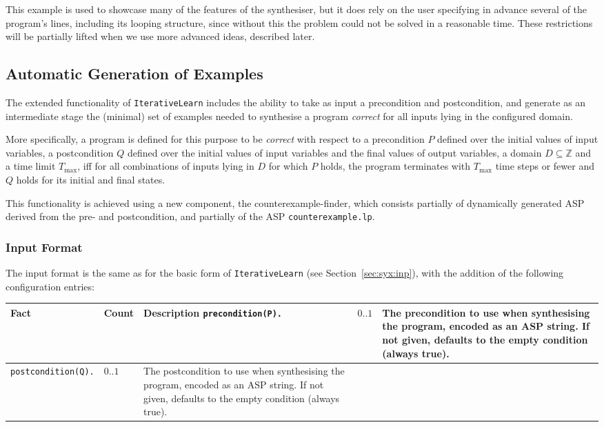 \documentclass[a4paper,twoside,notitlepage,12pt]{article}
\begin{document}
This example is used to showcase many of the features of the synthesiser, but 
it does rely on the user specifying in advance several of the program's lines, 
including its looping structure, since without this the problem could not be solved in 
a reasonable time. These restrictions will be partially lifted when we use more 
advanced ideas, described later.

\subsection{Automatic Generation of Examples} \label{sec:gnx}

The extended functionality of \verb|IterativeLearn| includes the ability to take as input a 
precondition and postcondition, and generate as an intermediate stage the (minimal) set of examples 
needed to synthesise a program \emph{correct} for all inputs lying in the configured domain.

More specifically, a program is defined for this purpose to be \emph{correct} with respect to a 
precondition $P$ defined over the initial values of input variables, a postcondition $Q$ defined 
over the initial values of input variables and the final values of output variables, a domain 
$D\subseteq\mathbb{Z}$ and a time limit $T_\mathrm{max}$, iff for all combinations of inputs lying 
in $D$ for which $P$ holds, the program terminates with $T_\mathrm{max}$ time steps or fewer and 
$Q$ holds for its initial and final states.

This functionality is achieved using a new component, the counterexample-finder, which consists 
partially of dynamically generated ASP derived from the pre- and postcondition, and partially of 
the ASP \verb|counterexample.lp|.

\subsubsection{Input Format} \label{sec:gnx:inp}

The input format is the same as for the basic form of \verb|IterativeLearn| (see 
Section~\ref{sec:syx:inp}), with the addition of the following configuration entries:

\begin{tabularx}{\textwidth}{|l|l|X|}
\hline
\textbf{Fact} & \textbf{Count} & \textbf{Description} \endhead
\hline
\verb|precondition(P).| & $0..1$ &
The precondition to use when synthesising the program, encoded as an ASP string. If not given, 
defaults to the empty condition (always true). \\*
\hline
\verb|postcondition(Q).| & $0..1$ &
The postcondition to use when synthesising the program, encoded as an ASP string. If not given, 
defaults to the empty condition (always true). \\*
\hline
\end{tabularx}
\end{document}
